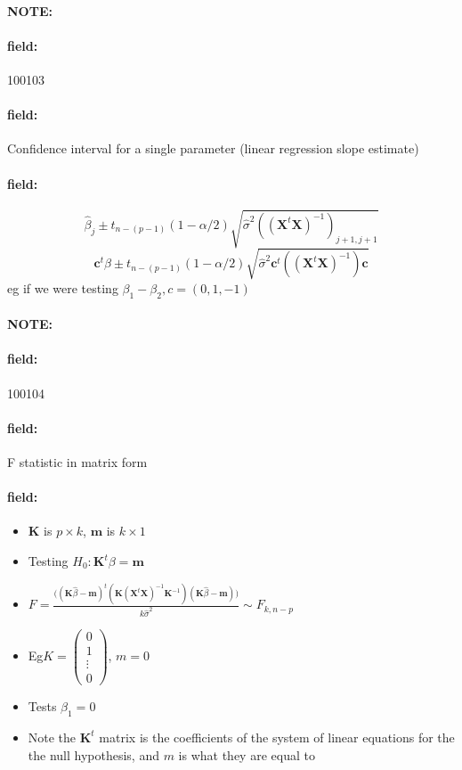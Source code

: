 \documentclass[12pt]{article}
\newenvironment{note}{\paragraph{NOTE:}}{}
\newenvironment{field}{\paragraph{field:}}{}
\begin{document}
\begin{note} \begin{field} \tiny 100103 \end{field}
 \begin{field}
  Confidence interval for a single parameter (linear regression slope estimate)
 \end{field}
 \begin{field}
  $$ \hat{\beta}_j \pm t_{n-(p-1)}(1 - \alpha/2)\sqrt{\hat{\sigma}^2((\mathbf{X}^t \mathbf{X})^{-1})_{j+1,j+1}} $$
  $$ \mathbf{c}^t \beta \pm t_{n-(p-1)}(1 - \alpha/2)\sqrt{\hat{\sigma}^2 \mathbf{c}^t((\mathbf{X}^t \mathbf{X})^{-1})\mathbf{c}}  $$
  eg if we were testing $\beta_1 - \beta_2, c = (0,1,-1)$
 \end{field}
\end{note}





\begin{note} \begin{field} \tiny 100104 \end{field}
 \begin{field}
  F statistic in matrix form
 \end{field}
 \begin{field}
  \begin{itemize}
   \item $\mathbf{K}$  is $p\times k$, $\mathbf{m}$ is $k\times 1$
   \item Testing $H_0: \mathbf{K}^t\beta = \mathbf{m}$
   \item $F = \frac{\big((\mathbf{K}\hat{\beta} - \mathbf{m})^t (\mathbf{K}(\mathbf{X}^t \mathbf{X})^{-1}\mathbf{K}^{-1})(\mathbf{K}\hat{\beta} - \mathbf{m})\big)}{k\hat{\sigma}^2} \sim F_{k,n-p}$
   \item Eg$K = \begin{pmatrix}
           0 \\ 1 \\ \vdots \\ 0
          \end{pmatrix}$, $m = 0$
   \item Tests $\beta_1 = 0$
   \item Note the $\mathbf{K}^t$ matrix is the coefficients of the system of linear equations for the the null hypothesis, and $m$ is what they are equal to
  \end{itemize}
 \end{field}
\end{note}
\end{document}
